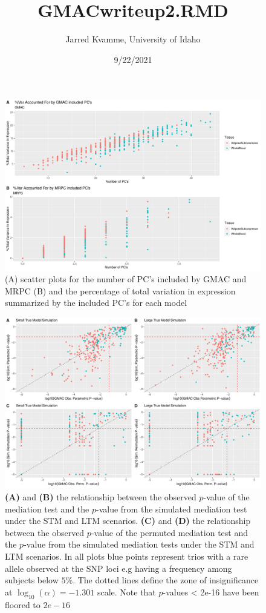 \documentclass[
]{article}
\title{GMACwriteup2.RMD}
\author{Jarred Kvamme, University of Idaho}
\date{9/22/2021}
\begin{document}
\maketitle

\begin{figure}
\centering
\includegraphics{GMACwriteup2_files/figure-latex/unnamed-chunk-1-1.pdf}
\caption{(A) scatter plots for the number of PC's included by GMAC and
MRPC (B) and the percentage of total variation in expression summarized
by the included PC's for each model}
\end{figure}

\begin{figure}
\centering
\includegraphics{GMACwriteup2_files/figure-latex/unnamed-chunk-2-1.pdf}
\caption{\textbf{(A)} and \textbf{(B)} the relationship between the
observed \(p\)-value of the mediation test and the \(p\)-value from the
simulated mediation test under the STM and LTM scenarios. \textbf{(C)}
and \textbf{(D)} the relationship between the observed \(p\)-value of
the permuted mediation test and the \(p\)-value from the simulated
mediation tests under the STM and LTM scenarios. In all plots blue
points represent trios with a rare allele observed at the SNP loci e.g
having a frequency among subjects below \(5\%\). The dotted lines define
the zone of insignificance at \(\log_{10}(\alpha) = -1.301\) scale. Note
that \(p\)-values \textless{} 2e-16 have been floored to \(2e-16\)}
\end{figure}
\end{document}
